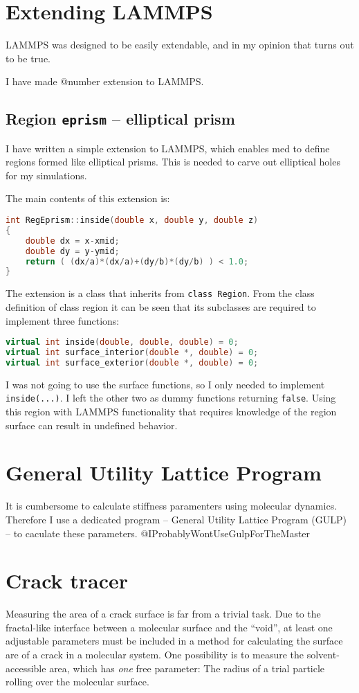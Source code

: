 \section{Extending LAMMPS}
LAMMPS was designed to be easily extendable, and in my opinion that turns out to be true.

I have made @number extension to LAMMPS.

\subsection{Region {\tt eprism} -- elliptical prism}
I have written a simple extension to LAMMPS, which enables med to define regions formed like elliptical prisms. This is needed to carve out elliptical holes for my simulations. 

The main contents of this extension is:

\begin{lstlisting}[language=c++]
int RegEprism::inside(double x, double y, double z) 
{
	double dx = x-xmid;
	double dy = y-ymid;
	return ( (dx/a)*(dx/a)+(dy/b)*(dy/b) ) < 1.0;
}
\end{lstlisting}

The extension is a class that inherits from {\tt class Region}. 
From the class definition of class region it can be seen that its subclasses are required to implement three functions:

\begin{lstlisting}[language=c++]
virtual int inside(double, double, double) = 0;
virtual int surface_interior(double *, double) = 0;
virtual int surface_exterior(double *, double) = 0;
\end{lstlisting}

I was not going to use the surface functions, so I only needed to implement {\tt inside(...)}. I left the other two as dummy functions returning {\tt false}. Using this region with LAMMPS functionality that requires knowledge of the region surface can result in undefined behavior.


\section{General Utility Lattice Program}
It is cumbersome to calculate stiffness paramenters using molecular dynamics. Therefore I use a dedicated program -- General Utility Lattice Program (GULP) -- to caculate these parameters. @IProbablyWontUseGulpForTheMaster

\section{Crack tracer}
Measuring the area of a crack surface is far from a trivial task. Due to the fractal-like interface between a molecular surface and the ``void'', at least one adjustable parameters must be included in a method for calculating the surface are of a crack in a molecular system. One possibility is to measure the solvent-accessible area, which has \emph{one} free parameter: The radius of a trial particle rolling over the molecular surface. 


